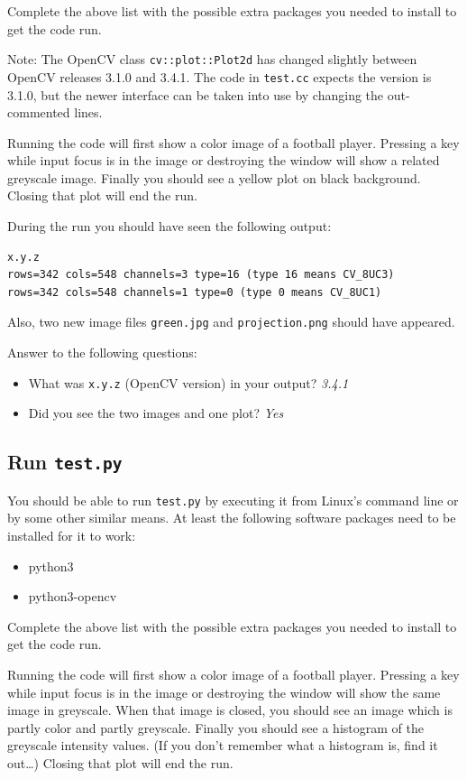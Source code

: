 \documentclass{article}
\begin{document}
Complete the above list with the possible extra packages you needed
to install to get the code run.

Note: The OpenCV class \texttt{cv::plot::Plot2d} has changed slightly
between OpenCV releases 3.1.0 and 3.4.1.  The code in \texttt{test.cc}
expects the version is 3.1.0, but the newer interface can be taken
into use by changing the out-commented lines.

Running the code will first show a color image of a football player.
Pressing a key while input focus is in the image or destroying the
window will show a related greyscale image.  Finally you should see a
yellow plot on black background.  Closing that plot will end the run.

During the run you should have seen the following output:

\begin{verbatim}
x.y.z
rows=342 cols=548 channels=3 type=16 (type 16 means CV_8UC3)
rows=342 cols=548 channels=1 type=0 (type 0 means CV_8UC1)
\end{verbatim}

Also, two new image files \texttt{green.jpg} and
\texttt{projection.png} should have appeared.

Answer to the following questions:

\begin{itemize}
\item What was \texttt{x.y.z} (OpenCV version) in your output? \emph{3.4.1}
\item Did you see the two images and one plot? \emph{Yes}
\end{itemize}


\subsection{Run \texttt{test.py}}

You should be able to run \texttt{test.py} by executing it from
Linux's command line or by some other similar means.  At least the
following software packages need to be installed for it to work:

\begin{itemize}
\item python3
\item python3-opencv
\end{itemize}

Complete the above list with the possible extra packages you needed
to install to get the code run.

Running the code will first show a color image of a football player.
Pressing a key while input focus is in the image or destroying the
window will show the same image in greyscale.  When that image is
closed, you should see an image which is partly color and partly
greyscale.  Finally you should see a histogram of the greyscale
intensity values.  (If you don't remember what a histogram is, find it
out\ldots) Closing that plot will end the run.
\end{document}
